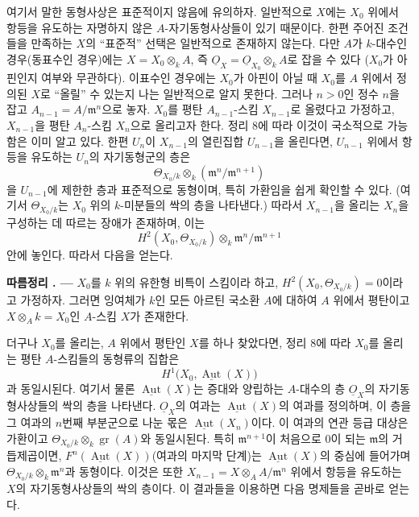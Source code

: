 \documentclass[11pt,twoside,openany]{book}
\numberwithin{equation}{section}
\newcommand{\Osh}{\underline{O}}
\theoremstyle{plain}
\theoremstyle{definition}
\theoremstyle{remark}
\newcommand{\result}[2]{%
  \par\medskip\noindent\textbf{#1%
  \if\relax\detokenize{#2}\relax\else\space#2\fi. ---}\enspace
}
\begin{document}
여기서 말한 동형사상은 표준적이지 않음에 유의하자. 일반적으로 $X$에는
$X_0$ 위에서 항등을 유도하는 자명하지 않은 $A$-자기동형사상들이 있기
때문이다. 한편 주어진 조건들을 만족하는 $X$의 ``표준적'' 선택은 일반적으로
존재하지 않는다. 다만 $A$가 $k$-대수인 경우(동표수인 경우)에는
$X=X_0\otimes_k A$, 즉 $\Osh_X=\Osh_{X_0}\otimes_k A$로 잡을 수 있다
($X_0$가 아핀인지 여부와 무관하다). 이표수인 경우에는 $X_0$가 아핀이 아닐
때 $X_0$를 $A$ 위에서 정의된 $X$로 ``올릴'' 수 있는지 나는 일반적으로
알지 못한다. 그러나 $n>0$인 정수 $n$을 잡고
$A_{n-1}=A/\mathfrak m^n$으로 놓자. $X_0$를 평탄 $A_{n-1}$-스킴
$X_{n-1}$로 올렸다고 가정하고, $X_{n-1}$을 평탄 $A_n$-스킴 $X_n$으로
올리고자 한다. 정리 8에 따라 이것이 국소적으로 가능함은 이미 알고 있다.
한편 $U_n$이 $X_{n-1}$의 열린집합 $U_{n-1}$을 올린다면, $U_{n-1}$ 위에서
항등을 유도하는 $U_n$의 자기동형군의 층은
\[
  \Theta_{X_0/k}\otimes_k(\mathfrak m^n/\mathfrak m^{n+1})
\]
을 $U_{n-1}$에 제한한 층과 표준적으로 동형이며, 특히 가환임을 쉽게
확인할 수 있다. (여기서 $\Theta_{X_0/k}$는 $X_0$ 위의 $k$-미분들의
싹의 층을 나타낸다.) 따라서 $X_{n-1}$을 올리는 $X_n$을 구성하는 데
따르는 장애가 존재하며, 이는
\[
  H^2(X_0,\Theta_{X_0/k})\otimes_k
  \mathfrak m^n/\mathfrak m^{n+1}
\]
안에 놓인다. 따라서 다음을 얻는다.

\result{따름정리}{1} $X_0$를 $k$ 위의 유한형 비특이 스킴이라 하고,
$H^2(X_0,\Theta_{X_0/k})=0$이라고 가정하자. 그러면 잉여체가 $k$인 모든
아르틴 국소환 $A$에 대하여 $A$ 위에서 평탄이고
$X\otimes_A k=X_0$인 $A$-스킴 $X$가 존재한다.

더구나 $X_0$를 올리는, $A$ 위에서 평탄인 $X$를 하나 찾았다면, 정리 8에
따라 $X_0$를 올리는 평탄 $A$-스킴들의 동형류의 집합은
\[
  H^1\bigl(X_0,\underline{\operatorname{Aut}}(X)\bigr)
\]
과 동일시된다. 여기서 물론 $\underline{\operatorname{Aut}}(X)$는 증대와
양립하는 $A$-대수의 층 $\Osh_X$의 자기동형사상들의 싹의 층을 나타낸다.
$\Osh_X$의 여과는 $\underline{\operatorname{Aut}}(X)$의 여과를 정의하며,
이 층을 그 여과의 $n$번째 부분군으로 나눈 몫은
$\underline{\operatorname{Aut}}(X_n)$이다. 이 여과의 연관 등급 대상은
가환이고 $\Theta_{X_0/k}\otimes_k\operatorname{gr}(A)$와 동일시된다.
특히 $\mathfrak m^{n+1}$이 처음으로 0이 되는 $\mathfrak m$의 거듭제곱이면,
$F^n(\underline{\operatorname{Aut}}(X))$(여과의 마지막 단계)는
$\underline{\operatorname{Aut}}(X)$의 중심에 들어가며
$\Theta_{X_0/k}\otimes_k\mathfrak m^n$과 동형이다. 이것은 또한
$X_{n-1}=X\otimes_A A/\mathfrak m^n$ 위에서 항등을 유도하는 $X$의
자기동형사상들의 싹의 층이다. 이 결과들을 이용하면 다음 명제들을 곧바로
얻는다.
\end{document}

